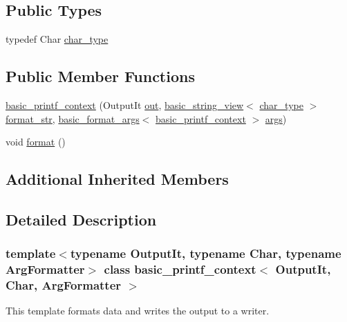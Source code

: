 \subsection*{Public Types}
\begin{DoxyCompactItemize}
\item 
typedef Char \hyperlink{classbasic__printf__context_a7f19ba5dfbcd66a87281c4b05bcf324e}{char\+\_\+type}
\end{DoxyCompactItemize}
\subsection*{Public Member Functions}
\begin{DoxyCompactItemize}
\item 
\hyperlink{classbasic__printf__context_ae71967bec500702473ba5b98d4e36aa2}{basic\+\_\+printf\+\_\+context} (Output\+It \hyperlink{classinternal_1_1context__base_ab77c1d5e2cf72ef323e1599be8567fee}{out}, \hyperlink{classbasic__string__view}{basic\+\_\+string\+\_\+view}$<$ \hyperlink{classbasic__printf__context_a7f19ba5dfbcd66a87281c4b05bcf324e}{char\+\_\+type} $>$ \hyperlink{format_8h_aa2b402011ee0619f2158f13e0827e585}{format\+\_\+str}, \hyperlink{classbasic__format__args}{basic\+\_\+format\+\_\+args}$<$ \hyperlink{classbasic__printf__context}{basic\+\_\+printf\+\_\+context} $>$ \hyperlink{classinternal_1_1context__base_a2dffc62b4cf30e9a359c1c85827c8c43}{args})
\item 
void \hyperlink{classbasic__printf__context_a1740a3a0a6d2748e4f489fb9b4b9e82c}{format} ()
\end{DoxyCompactItemize}
\subsection*{Additional Inherited Members}


\subsection{Detailed Description}
\subsubsection*{template$<$typename Output\+It, typename Char, typename Arg\+Formatter$>$\newline
class basic\+\_\+printf\+\_\+context$<$ Output\+It, Char, Arg\+Formatter $>$}

This template formats data and writes the output to a writer. 

